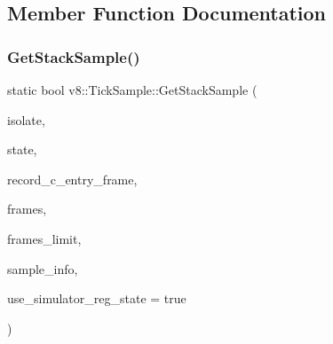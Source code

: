 \subsection{Member Function Documentation}
\mbox{\label{structv8_1_1TickSample_a297e05d112f3c749bfead215393646c1}} 
\subsubsection{\texorpdfstring{Get\+Stack\+Sample()}{GetStackSample()}}
{\footnotesize\ttfamily static bool v8\+::\+Tick\+Sample\+::\+Get\+Stack\+Sample (\begin{DoxyParamCaption}\item[{Isolate $\ast$}]{isolate,  }\item[{\mbox{\hyperlink{structv8_1_1RegisterState}{v8\+::\+Register\+State}} $\ast$}]{state,  }\item[{Record\+C\+Entry\+Frame}]{record\+\_\+c\+\_\+entry\+\_\+frame,  }\item[{void $\ast$$\ast$}]{frames,  }\item[{size\+\_\+t}]{frames\+\_\+limit,  }\item[{\mbox{\hyperlink{structv8_1_1SampleInfo}{v8\+::\+Sample\+Info}} $\ast$}]{sample\+\_\+info,  }\item[{bool}]{use\+\_\+simulator\+\_\+reg\+\_\+state = {\ttfamily true} }\end{DoxyParamCaption})\hspace{0.3cm}{\ttfamily [static]}}

